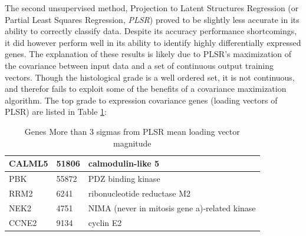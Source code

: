 \documentclass[a4paper,10pt]{article}
\begin{document}
The second unsupervised method, Projection to Latent Structures Regression (or Partial Least Squares Regression, \emph{PLSR})\cite{Wold1} proved to 
be slightly less accurate in its ability to correctly classify data. Despite its accuracy performance shortcomings, it did however
perform well in its ability to identify highly differentially expressed genes. The explanation of these results is likely due to PLSR's maximization of the covariance
between input data and a set of continuous output training vectors. Though the histological grade is a well ordered set, it is not continuous, and therefor fails to
exploit some of the benefits of a covariance maximization algorithm. The top grade to expression covariance genes (loading vectors of PLSR) are listed in Table \ref{TPLSR}:
\begin{table}
\begin{center}
\begin{tabular}{| l | l | l |}
\hline
CALML5 & 51806 & calmodulin-like 5\\ \hline
PBK & 55872 & PDZ binding kinase\\ \hline
RRM2 & 6241 & ribonucleotide reductase M2\\ \hline
NEK2 & 4751 & NIMA (never in mitosis gene a)-related kinase\\ \hline
CCNE2 & 9134 & cyclin E2 \\ \hline
 \end{tabular}
\end{center}\caption{Genes More than 3 sigmas from PLSR mean loading vector magnitude}\label{TPLSR}
\end{table}



\end{document}
